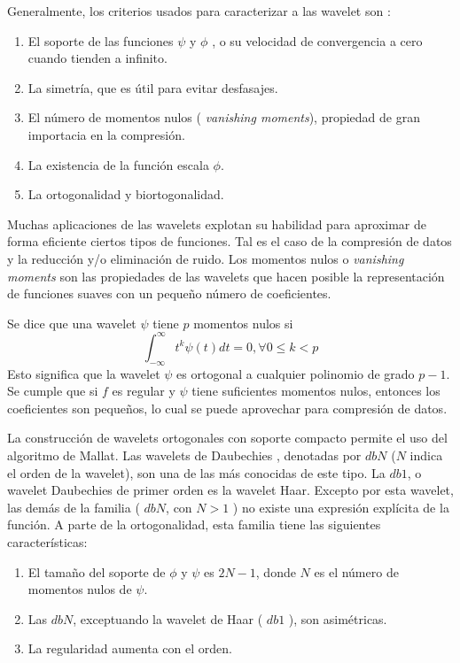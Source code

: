 Generalmente, los criterios usados para caracterizar a las wavelet son \cite{misiti2007wavelets}:
\begin{enumerate}
	\item El soporte de las funciones $\psi$ y $\phi$ , o su velocidad de convergencia a  cero cuando tienden a 
		infinito.
	\item La simetría, que es útil para evitar desfasajes.
	\item El número de momentos nulos ( \textit{vanishing moments}), propiedad de gran importacia en la compresión.
	\item La existencia de la función escala $\phi$.
	\item La ortogonalidad y biortogonalidad.
\end{enumerate}

Muchas aplicaciones de las wavelets explotan su habilidad para aproximar de forma eficiente ciertos tipos de 
funciones. Tal es el caso de la compresión de datos y la reducción y/o eliminación de ruido.
Los momentos nulos o \textit{vanishing moments} son las propiedades de las wavelets que 
hacen posible la representación de funciones suaves con un pequeño número de coeficientes.

Se dice que una wavelet $\psi$ tiene $p$ momentos nulos si
\begin{equation}
	\int_{-\infty}^{\infty} t^k\psi(t)dt= 0 , \forall 0 \leq k < p
\end{equation}
Esto significa que la wavelet $\psi$ es ortogonal a cualquier polinomio de grado $p-1$.
Se cumple que si $f$ es regular y $\psi$ tiene suficientes momentos nulos, entonces los coeficientes 
son pequeños, lo cual se puede aprovechar para compresión de datos.

La construcción de wavelets ortogonales con soporte compacto permite el uso del algoritmo de Mallat.
Las  wavelets de Daubechies \cite{daubechies1992}, denotadas por $dbN$ ($N$ indica el orden de la wavelet),
son una de las más conocidas de este tipo. La $db1$, o wavelet Daubechies de primer orden es la wavelet Haar.
Excepto por esta wavelet, las demás de la familia ( $dbN$, con $N>1$ ) no existe una expresión explícita de la 
función. A parte de la ortogonalidad, esta familia tiene las siguientes características:

\begin{enumerate}
	\item El tamaño del soporte de $\phi$ y $\psi$ es $2N-1$, donde $N$ es el número de momentos nulos de $\psi$.
	\item Las $dbN$, exceptuando la wavelet de Haar ( $db1$ ), son asimétricas.
	\item La regularidad aumenta con el orden.
\end{enumerate}

